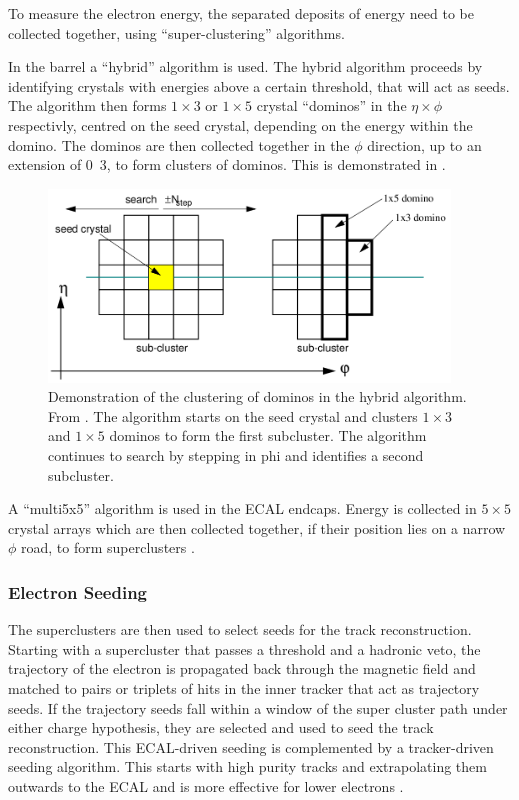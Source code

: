To measure the electron energy, the separated deposits of energy need to be
collected together, using ``super-clustering'' algorithms. 

In the barrel a ``hybrid'' algorithm is used. The hybrid algorithm proceeds by
identifying crystals with energies above a certain threshold, that will act as
seeds. The algorithm then forms $1\times3$ or $1\times5$ crystal ``dominos'' in
the $\eta\times\phi$ respectivly, centred on the seed crystal, depending on the
energy within the domino. The dominos are then collected together in the $\phi$
direction, up to an extension of \unit{0.3}{\rad}, to form clusters of dominos.
This is demonstrated in  \cite{meschi2001electron}.

\begin{figure}[htbp]
  \centering
  \includegraphics[width=0.95\textwidth]{hybridalgo}
  \caption{Demonstration of the clustering of dominos in the hybrid algorithm.
From \cite{meschi2001electron}. The algorithm starts on the seed crystal and clusters
$1\times3$ and $1\times5$ dominos to form the first subcluster. The algorithm continues to search
by stepping in phi and identifies a second subcluster.}
  \label{fig:hybrid}
\end{figure}

A ``multi5x5'' algorithm is used in the ECAL endcaps. Energy is collected in
$5\times5$ crystal arrays which are then collected together, if their position lies on
a narrow $\phi$ road, to form superclusters \cite{meschi2001electron}.

\subsubsection{Electron Seeding}
The superclusters are then used to select seeds for the track reconstruction.
Starting with a supercluster that passes a \pt threshold and a hadronic veto,
the trajectory of the electron is propagated back through the magnetic field and
matched to pairs or triplets of hits in the inner tracker that act as trajectory
seeds.  If the trajectory seeds fall within a window of the super cluster path
under either charge hypothesis, they are selected and used to seed the track
reconstruction.  This ECAL-driven seeding is complemented by a tracker-driven
seeding algorithm.  This starts with high purity tracks and extrapolating them
outwards to the ECAL and is more effective for lower \pt electrons \cite{baffioni2007electron,adam2009electron}.

